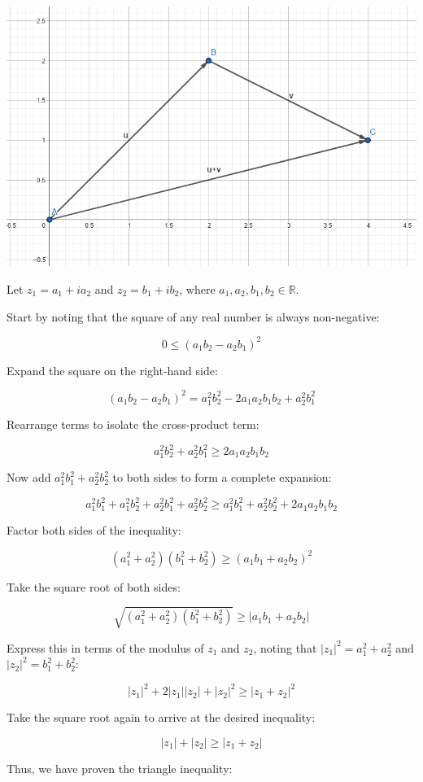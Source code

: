 \documentclass[12pt]{article}
\begin{document}
\begin{enumerate}
\begin{enumerate}
    \includegraphics[width=0.75\linewidth]{Math 135//Assignments/image.png}

    Let \( z_1 = a_1 + i a_2 \) and \( z_2 = b_1 + i b_2 \), where \( a_1, a_2, b_1, b_2 \in \mathbb{R} \).

Start by noting that the square of any real number is always non-negative:

\[
0 \leq (a_1b_2 - a_2b_1)^2
\]

Expand the square on the right-hand side:

\[
(a_1b_2 - a_2b_1)^2 = a_1^2b_2^2 - 2a_1a_2b_1b_2 + a_2^2b_1^2
\]

Rearrange terms to isolate the cross-product term:

\[
a_1^2b_2^2 + a_2^2b_1^2 \geq 2a_1a_2b_1b_2
\]

Now add \( a_1^2b_1^2 + a_2^2b_2^2 \) to both sides to form a complete expansion:

\[
a_1^2b_1^2 + a_1^2b_2^2 + a_2^2b_1^2 + a_2^2b_2^2 \geq a_1^2b_1^2 + a_2^2b_2^2 + 2a_1a_2b_1b_2
\]

Factor both sides of the inequality:

\[
(a_1^2 + a_2^2)(b_1^2 + b_2^2) \geq (a_1b_1 + a_2b_2)^2
\]

Take the square root of both sides:

\[
\sqrt{(a_1^2 + a_2^2)(b_1^2 + b_2^2)} \geq |a_1b_1 + a_2b_2|
\]

Express this in terms of the modulus of \( z_1 \) and \( z_2 \), noting that \( |z_1|^2 = a_1^2 + a_2^2 \) and \( |z_2|^2 = b_1^2 + b_2^2 \):

\[
|z_1|^2 + 2|z_1||z_2| + |z_2|^2 \geq |z_1 + z_2|^2
\]

Take the square root again to arrive at the desired inequality:

\[
|z_1| + |z_2| \geq |z_1 + z_2|
\]

Thus, we have proven the triangle inequality:


\end{enumerate}
\end{enumerate}
\end{document}
